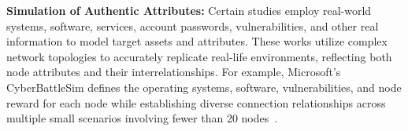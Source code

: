 \textbf{Simulation of Authentic Attributes:} Certain studies employ real-world systems, software, services, account passwords, vulnerabilities, and other real information to model target assets and attributes. These works utilize complex network topologies to accurately replicate real-life environments, reflecting both node attributes and their interrelationships. For example, Microsoft's CyberBattleSim defines the operating systems, software, vulnerabilities, and node reward for each node while establishing diverse connection relationships across multiple small scenarios involving fewer than 20 nodes~\cite{Cyberbattlesim}.







